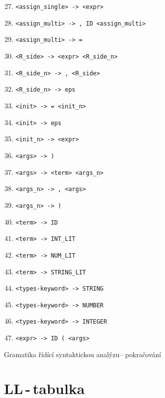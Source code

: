 \documentclass[11pt]{article}
\begin{document}
\begin{table}[H]
    \centering
    \begin{enumerate}
        \setcounter{enumi}{26}
        \item \verb|<assign_single> -> <expr>|

        \item \verb|<assign_multi> -> , ID <assign_multi>|
        \item \verb|<assign_multi> -> =|

        \item \verb|<R_side> -> <expr> <R_side_n>|
        \item \verb|<R_side_n> -> , <R_side>|
        \item \verb|<R_side_n> -> eps|

        \item \verb|<init> -> = <init_n>|
        \item \verb|<init> -> eps|
        \item \verb|<init_n> -> <expr>|

        \item \verb|<args> -> )|
        \item \verb|<args> -> <term> <args_n>|
        \item \verb|<args_n> -> , <args>|
        \item \verb|<args_n> -> )|

        \item \verb|<term> -> ID|
        \item \verb|<term> -> INT_LIT|
        \item \verb|<term> -> NUM_LIT|
        \item \verb|<term> -> STRING_LIT|

        \item \verb|<types-keyword> -> STRING|
        \item \verb|<types-keyword> -> NUMBER|
        \item \verb|<types-keyword> -> INTEGER|

        \item \verb|<expr> -> ID ( <args>|

    \end{enumerate}
    \caption{Gramatika řídící syntaktickou analýzu\,--\,pokračování}
    \label{tab:ll-gramatika-pokracovani}
\end{table}

\section{LL\,-\,tabulka}
\end{document}
